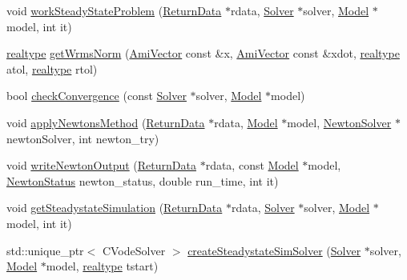 \begin{DoxyCompactItemize}
\item 
void \mbox{\hyperlink{classamici_1_1_steadystate_problem_aa2630b3401b8f0a50bf50c73d4f39790}{work\+Steady\+State\+Problem}} (\mbox{\hyperlink{classamici_1_1_return_data}{Return\+Data}} $\ast$rdata, \mbox{\hyperlink{classamici_1_1_solver}{Solver}} $\ast$solver, \mbox{\hyperlink{classamici_1_1_model}{Model}} $\ast$model, int it)
\item 
\mbox{\hyperlink{namespaceamici_a1bdce28051d6a53868f7ccbf5f2c14a3}{realtype}} \mbox{\hyperlink{classamici_1_1_steadystate_problem_afd3dce48510d1fce72b18049b40fff5a}{get\+Wrms\+Norm}} (\mbox{\hyperlink{classamici_1_1_ami_vector}{Ami\+Vector}} const \&x, \mbox{\hyperlink{classamici_1_1_ami_vector}{Ami\+Vector}} const \&xdot, \mbox{\hyperlink{namespaceamici_a1bdce28051d6a53868f7ccbf5f2c14a3}{realtype}} atol, \mbox{\hyperlink{namespaceamici_a1bdce28051d6a53868f7ccbf5f2c14a3}{realtype}} rtol)
\item 
bool \mbox{\hyperlink{classamici_1_1_steadystate_problem_a06f944df556560112e76a23213bf3f51}{check\+Convergence}} (const \mbox{\hyperlink{classamici_1_1_solver}{Solver}} $\ast$solver, \mbox{\hyperlink{classamici_1_1_model}{Model}} $\ast$model)
\item 
void \mbox{\hyperlink{classamici_1_1_steadystate_problem_a1c33ff72fd843a1a51cd93448e3e5a77}{apply\+Newtons\+Method}} (\mbox{\hyperlink{classamici_1_1_return_data}{Return\+Data}} $\ast$rdata, \mbox{\hyperlink{classamici_1_1_model}{Model}} $\ast$model, \mbox{\hyperlink{classamici_1_1_newton_solver}{Newton\+Solver}} $\ast$newton\+Solver, int newton\+\_\+try)
\item 
void \mbox{\hyperlink{classamici_1_1_steadystate_problem_a3dba8c3909bae68f98d6bf1bb82099da}{write\+Newton\+Output}} (\mbox{\hyperlink{classamici_1_1_return_data}{Return\+Data}} $\ast$rdata, const \mbox{\hyperlink{classamici_1_1_model}{Model}} $\ast$model, \mbox{\hyperlink{namespaceamici_a3fb34b6904b8b45827b51132977431da}{Newton\+Status}} newton\+\_\+status, double run\+\_\+time, int it)
\item 
void \mbox{\hyperlink{classamici_1_1_steadystate_problem_a7567ea97f4d840e7df61340b5129f4cd}{get\+Steadystate\+Simulation}} (\mbox{\hyperlink{classamici_1_1_return_data}{Return\+Data}} $\ast$rdata, \mbox{\hyperlink{classamici_1_1_solver}{Solver}} $\ast$solver, \mbox{\hyperlink{classamici_1_1_model}{Model}} $\ast$model, int it)
\item 
std\+::unique\+\_\+ptr$<$ C\+Vode\+Solver $>$ \mbox{\hyperlink{classamici_1_1_steadystate_problem_ad219bc64b739a9ff5d52555b0433577b}{create\+Steadystate\+Sim\+Solver}} (\mbox{\hyperlink{classamici_1_1_solver}{Solver}} $\ast$solver, \mbox{\hyperlink{classamici_1_1_model}{Model}} $\ast$model, \mbox{\hyperlink{namespaceamici_a1bdce28051d6a53868f7ccbf5f2c14a3}{realtype}} tstart)

\end{DoxyCompactItemize}
